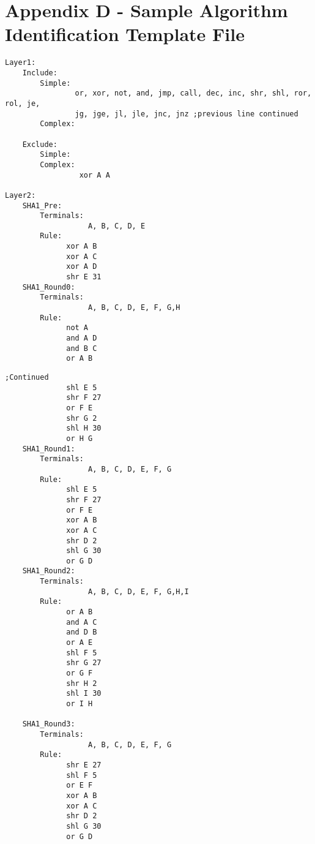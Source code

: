 \documentclass{article}
\begin{document}
\pagebreak

\section*{Appendix D - Sample Algorithm Identification Template File}
\begin{algorithm}
\lstset{language=[mips]Assembler}
\begin{lstlisting}
Layer1:
    Include:
        Simple: 
                or, xor, not, and, jmp, call, dec, inc, shr, shl, ror, rol, je,
                jg, jge, jl, jle, jnc, jnz ;previous line continued
        Complex: 

    Exclude:
        Simple:
        Complex: 
                 xor A A

Layer2:
    SHA1_Pre:
        Terminals: 
                   A, B, C, D, E
        Rule: 
              xor A B
              xor A C
              xor A D
              shr E 31
    SHA1_Round0:
        Terminals: 
                   A, B, C, D, E, F, G,H
        Rule: 
              not A
              and A D
              and B C
              or A B
\end{lstlisting}
\end{algorithm}              
\begin{algorithm}
\lstset{language=[mips]Assembler}
\begin{lstlisting}
;Continued
              shl E 5
              shr F 27
              or F E
              shr G 2
              shl H 30
              or H G
    SHA1_Round1:
        Terminals: 
                   A, B, C, D, E, F, G
        Rule: 
              shl E 5
              shr F 27
              or F E
              xor A B
              xor A C
              shr D 2
              shl G 30
              or G D
    SHA1_Round2:
        Terminals: 
                   A, B, C, D, E, F, G,H,I
        Rule: 
              or A B
              and A C
              and D B
              or A E
              shl F 5
              shr G 27
              or G F
              shr H 2
              shl I 30
              or I H

    SHA1_Round3:
        Terminals: 
                   A, B, C, D, E, F, G
        Rule: 
              shr E 27
              shl F 5
              or E F
              xor A B
              xor A C
              shr D 2
              shl G 30
              or G D
\end{lstlisting}
\end{algorithm}              
\end{document}
